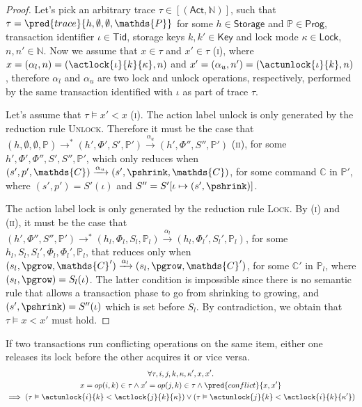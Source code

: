 \begin{proof}
Let's pick an arbitrary trace $\tau \in [(\mathsf{Act}, \mathds{N})]$, such that $\tau = \pred{trace}{h, \emptyset, \emptyset, \mathds{P}}$ for some $h \in \mathsf{Storage}$ and $\mathds{P} \in \mathsf{Prog}$, transaction identifier $\iota \in \mathsf{Tid}$, storage keys $k, k' \in \mathsf{Key}$ and lock mode $\kappa \in \mathsf{Lock}$, $n, n' \in \mathds{N}$. Now we assume that  $x \in \tau$ and $x' \in \tau$ (\textsc{i}), where $x = (\alpha_l, n) = (\actlock{\iota}{k}{\kappa}, n)$ and $x' = (\alpha_u, n') = (\actunlock{\iota}{k}, n)$, therefore $\alpha_l$ and $\alpha_u$ are two lock and unlock operations, respectively, performed by the same transaction identified with $\iota$ as part of trace $\tau$.

Let's assume that $\tau \vDash x' < x$ (\textsc{i}). The action label \textsf{unlock} is only generated by the reduction rule \textsc{Unlock}. Therefore it must be the case that $(h, \emptyset, \emptyset, \mathds{P}) \rightarrow^* (h', \Phi', S', \mathds{P}') \xrightarrow{\alpha_u} (h', \Phi'', S'', \mathds{P}')$ (\textsc{ii}), for some $h', \Phi', \Phi'', S', S'', \mathds{P}'$, which only reduces when $(s', p', \mathds{C}) \xrightarrow{\alpha_u} (s', \pshrink, \mathds{C})$, for some command $\mathds{C}$ in $\mathds{P}'$, where $(s', p') = S'(\iota)$ and $S'' = S'[\iota \mapsto (s', \pshrink)]$.

The action label \textsf{lock} is only generated by the reduction rule \textsc{Lock}. By (\textsc{i}) and (\textsc{ii}), it must be the case that $(h', \Phi'', S'', \mathds{P}') \rightarrow^* (h_l, \Phi_l, S_l, \mathds{P}_l) \xrightarrow{\alpha_l} (h_l, \Phi_l', S_l', \mathds{P}_l)$, for some $h_l, S_l, S_l', \Phi_l, \Phi_l', \mathds{P}_l$, that reduces only when $(s_l, \pgrow, \mathds{C}') \xrightarrow{\alpha_l} (s_l, \pgrow, \mathds{C}')$, for some $\mathds{C}'$ in $\mathds{P}_l$, where $(s_l, \pgrow) = S_l(\iota)$. The latter condition is impossible since there is no semantic rule that allows a transaction phase to go from shrinking to growing, and $(s', \pshrink) = S''(\iota)$ which is set before $S_l$. By contradiction, we obtain that $\tau \vDash x < x'$ must hold.
\end{proof}

\lem \label{lem:conflict} If two transactions run conflicting operations on the same item, either one releases its lock before the other acquires it or vice versa.
\begin{gather*}
\forall \tau, i, j, k, \kappa, \kappa', x, x' \ldotp \\
x = op(i, k) \in \tau \land x' = op(j, k) \in \tau \land \pred{conflict}{x, x'} \\
\implies \left( \tau \vDash \actunlock{i}{k} < \actlock{j}{k}{\kappa} \right) \lor \left( \tau \vDash \actunlock{j}{k} < \actlock{i}{k}{\kappa'} \right)
\end{gather*}

